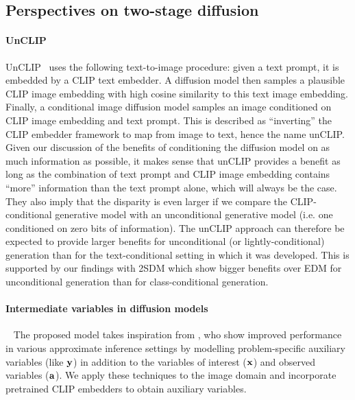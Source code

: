 \subsection{Perspectives on two-stage diffusion}
\paragraph{UnCLIP} \label{sec:unclip}
UnCLIP~\citep{ramesh2022hierarchical} uses the following text-to-image procedure: given a text prompt, it is embedded by a CLIP text embedder. A diffusion model then samples a plausible CLIP image embedding with high cosine similarity to this text image embedding. Finally, a conditional image diffusion model samples an image conditioned on CLIP image embedding and text prompt. This is described as ``inverting'' the CLIP embedder framework to map from image to text, hence the name unCLIP. Given our discussion of the benefits of conditioning the diffusion model on as much information as possible, it makes sense that unCLIP provides a benefit as long as the combination of text prompt and CLIP image embedding contains ``more'' information than the text prompt alone, which will always be the case. They also imply that the disparity is even larger if we compare the CLIP-conditional generative model with an unconditional generative model (i.e. one conditioned on zero bits of information). The unCLIP approach can therefore be expected to provide larger benefits for unconditional (or lightly-conditional) generation than for the text-conditional setting in which it was developed. This is supported by our findings with 2SDM which show bigger benefits over EDM for unconditional generation than for class-conditional generation.

\paragraph{Intermediate variables in diffusion models}~
 The proposed model takes inspiration from \citet{weilbach2023graphically}, %
who show improved performance in various approximate inference settings by modelling problem-specific auxiliary variables (like ${\mathbf{y}}$) in addition to the variables of interest (${\mathbf{x}}$) and observed variables (${\mathbf{a}}$). We apply these techniques to the image domain and incorporate pretrained CLIP embedders to obtain auxiliary variables. 

